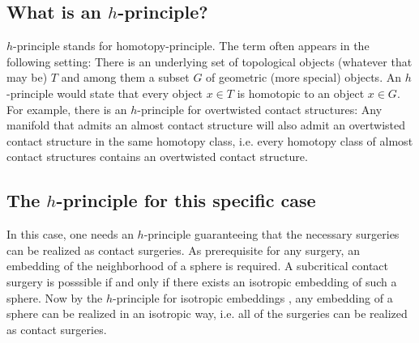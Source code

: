 
\subsection{What is an $h$-principle?}
$h$-principle stands for homotopy-principle. The term often appears in the following setting: There is an underlying set of topological objects (whatever that may be) $T$
and among them a subset $G$ of geometric (more special) objects. An $h$-principle would state that every object $x \in T$ is homotopic to an object $x \in G$.
For example, there is an $h$-principle for overtwisted contact structures: Any manifold that admits an almost contact structure will also admit an overtwisted
contact structure in the same homotopy class, i.e. every homotopy class of almost contact structures contains an overtwisted contact structure.


\subsection{The $h$-principle for this specific case}
In this case, one needs an $h$-principle guaranteeing that the necessary surgeries can be realized as contact surgeries.
As prerequisite for any surgery, an embedding of the neighborhood of a sphere is required. 
A subcritical contact surgery is posssible if and only if there exists an isotropic embedding of such a sphere.
Now by the $h$-principle for isotropic embeddings \cite[section 12.4]{EM02}, any embedding of a sphere can be realized in an isotropic way,
i.e. all of the surgeries can be realized as contact surgeries.


